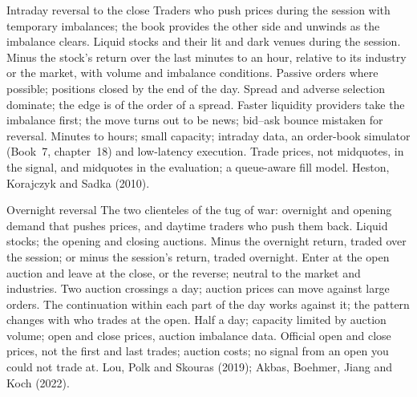 \begin{strategyfile}{Intraday reversal to the close}\label{strat:s1:short-term-reversal:intraday}
 Traders who push prices during the session with temporary imbalances; the book provides the other side and unwinds as the
imbalance clears.
 Liquid stocks and their lit and dark venues during the session.
 Minus the stock's return over the last minutes to an hour, relative to its industry or the market, with volume and imbalance conditions.
 Passive orders where possible; positions closed by the end of the day.
 Spread and adverse selection dominate; the edge is of the order of a spread.
 Faster liquidity providers take the imbalance first; the move turns out to be news; bid--ask bounce mistaken for reversal.
 Minutes to hours; small capacity; intraday data, an order-book simulator (Book~7, chapter~18) and low-latency
execution.
 Trade prices, not midquotes, in the signal, and midquotes in the evaluation; a queue-aware fill model.
 Heston, Korajczyk and Sadka (2010).
\end{strategyfile}

\begin{strategyfile}{Overnight reversal}\label{strat:s1:short-term-reversal:overnight}
 The two clienteles of the tug of war: overnight and opening demand that pushes prices, and daytime traders who push them back.
 Liquid stocks; the opening and closing auctions.
 Minus the overnight return, traded over the session; or minus the session's return, traded overnight.
 Enter at the open auction and leave at the close, or the reverse; neutral to the market and industries.
 Two auction crossings a day; auction prices can move against large orders.
 The continuation within each part of the day works against it; the pattern changes with who trades at the open.
 Half a day; capacity limited by auction volume; open and close prices, auction imbalance data.
 Official open and close prices, not the first and last trades; auction costs; no signal from an open you could not trade at.
 Lou, Polk and Skouras (2019); Akbas, Boehmer, Jiang and Koch (2022).
\end{strategyfile}


